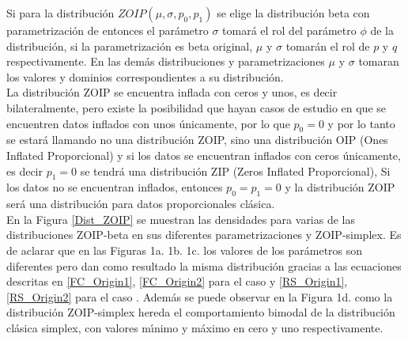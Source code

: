 Si para la distribuci\'{o}n $ZOIP(\mu, \sigma, p_0, p_1)$ se elige la distribuci\'{o}n beta con parametrizaci\'{o}n de \cite{Ferrari2} entonces el par\'{a}metro $\sigma$ tomar\'{a} el rol del par\'{a}metro $\phi$ de la distribuci\'{o}n, si la parametrizaci\'{o}n es beta original, $\mu$ y $\sigma$ tomar\'{a}n el rol de $p$ y $q$ respectivamente. En las dem\'{a}s distribuciones y parametrizaciones $\mu$ y $\sigma$ tomaran los valores y dominios correspondientes a su distribuci\'{o}n.\\

La distribuci\'{o}n ZOIP se encuentra inflada con ceros y unos, es decir bilateralmente, pero existe la posibilidad que hayan casos de estudio en que se encuentren datos inflados con unos \'{u}nicamente, por lo que $p_0=0$ y por lo tanto se estar\'{a} llamando no una distribuci\'{o}n ZOIP, sino una distribuci\'{o}n OIP (Ones Inflated Proporcional) y si los datos se encuentran inflados con ceros \'{u}nicamente, es decir $p_1=0$ se tendr\'{a} una distribuci\'{o}n ZIP (Zeros Inflated Proporcional), Si los datos no se encuentran inflados, entonces $p_0=p_1=0$ y la distribuci\'{o}n ZOIP ser\'{a} una distribuci\'{o}n para datos proporcionales cl\'{a}sica.\\

En la Figura \ref{Dist_ZOIP} se muestran las densidades para varias de las distribuciones ZOIP-beta en sus diferentes parametrizaciones y ZOIP-simplex. Es de aclarar que en las Figuras 1a. 1b. 1c. los valores de los par\'{a}metros son diferentes pero dan como resultado la misma distribuci\'{o}n gracias a las ecuaciones descritas en \eqref{FC_Origin1}, \eqref{FC_Origin2} para el caso \cite{Ferrari2} y \eqref{RS_Origin1}, \eqref{RS_Origin2} para el caso \cite{Stasinopoulos2}. Adem\'{a}s se puede observar en la Figura 1d. como la distribuci\'{o}n ZOIP-simplex hereda el comportamiento bimodal de la distribuci\'{o}n cl\'{a}sica simplex, con valores m\'{\i}nimo y m\'{a}ximo en cero y uno respectivamente. 

